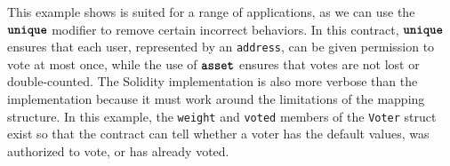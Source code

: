 \documentclass[nonacm, dvipsnames, usenames, sigconf]{acmart}
\begin{document}
This example shows \langName is suited for a range of applications, as we can use the $\textbf{\texttt{unique}}$ modifier to remove certain incorrect behaviors.
In this contract, $\textbf{\texttt{unique}}$ ensures that each user, represented by an \lstinline{address}, can be given permission to vote at most once, while the use of $\textbf{\texttt{asset}}$ ensures that votes are not lost or double-counted.
The Solidity implementation is also more verbose than the \langName implementation because it must work around the limitations of the mapping structure.
In this example, the \lstinline{weight} and \lstinline{voted} members of the \lstinline{Voter} struct exist so that the contract can tell whether a voter has the default values, was authorized to vote, or has already voted.


\end{document}
